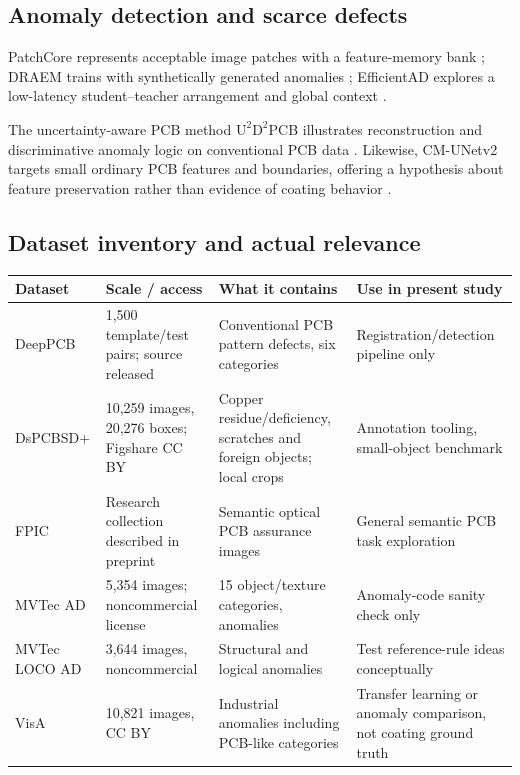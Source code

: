 \subsection{Anomaly detection and scarce defects}
PatchCore represents acceptable image patches with a feature-memory bank \citep{roth2022patchcore}; DRAEM trains with synthetically generated anomalies \citep{zavrtanik2021draem}; EfficientAD explores a low-latency student--teacher arrangement and global context \citep{batzner2024efficientad}.

The uncertainty-aware PCB method $\mathrm{U}^{2}\mathrm{D}^{2}$PCB illustrates reconstruction and discriminative anomaly logic on conventional PCB data \citep{u2d2pcb2024}. Likewise, CM-UNetv2 targets small ordinary PCB features and boundaries, offering a hypothesis about feature preservation rather than evidence of coating behavior \citep{guo2025cmunet}.

\subsection{Dataset inventory and actual relevance}
\begin{table}[htbp]\centering\footnotesize
\begin{tabularx}{\textwidth}{p{25mm}p{25mm}X p{27mm}}\toprule
Dataset & Scale / access & What it contains & Use in present study \\\midrule
DeepPCB \citep{tang2019deeppcb} & 1,500 template/test pairs; source released & Conventional PCB pattern defects, six categories & Registration/detection pipeline only\\
DsPCBSD+ \citep{lv2024dspcb,dspcbfigshare} & 10,259 images, 20,276 boxes; Figshare CC BY & Copper residue/deficiency, scratches and foreign objects; local crops & Annotation tooling, small-object benchmark\\
FPIC \citep{jessurun2022fpic} & Research collection described in preprint & Semantic optical PCB assurance images & General semantic PCB task exploration\\
MVTec AD \citep{bergmann2019mvtec,mvtecdataset} & 5,354 images; noncommercial license & 15 object/texture categories, anomalies & Anomaly-code sanity check only\\
MVTec LOCO AD \citep{bergmann2022loco} & 3,644 images, noncommercial & Structural and logical anomalies & Test reference-rule ideas conceptually\\
VisA \citep{visa2022dataset} & 10,821 images, CC BY & Industrial anomalies including PCB-like categories & Transfer learning or anomaly comparison, not coating ground truth\\
\bottomrule\end{tabularx}
\end{table}

